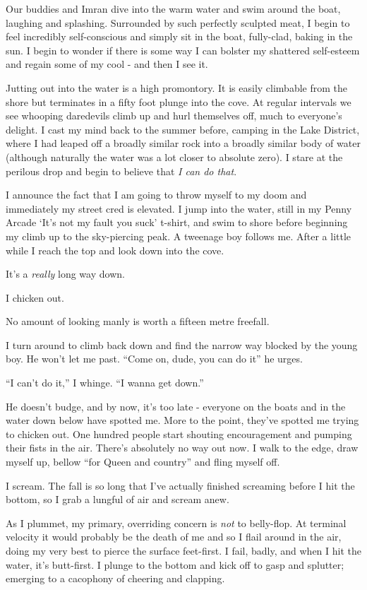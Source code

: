 \documentclass[a5paper,titlepage,11pt,draft]{book}
\begin{document}
Our buddies and Imran dive into the warm water and swim around the boat, laughing and splashing.  Surrounded by such perfectly sculpted meat, I begin to feel incredibly self-conscious and simply sit in the boat, fully-clad, baking in the sun.  I begin to wonder if there is some way I can bolster my shattered self-esteem and regain some of my cool - and then I see it.

Jutting out into the water is a high promontory.  It is easily climbable from the shore but terminates in a fifty foot plunge into the cove.  At regular intervals we see whooping daredevils climb up and hurl themselves off, much to everyone's delight.  I cast my mind back to the summer before, camping in the Lake District, where I had leaped off a broadly similar rock into a broadly similar body of water (although naturally the water was a lot closer to absolute zero).  I stare at the perilous drop and begin to believe that \emph{I can do that}.

I announce the fact that I am going to throw myself to my doom and immediately my street cred is elevated.  I jump into the water, still in my Penny Arcade `It's not my fault you suck' t-shirt, and swim to shore before beginning my climb up to the sky-piercing peak.  A tweenage boy follows me.  After a little while I reach the top and look down into the cove.

It's a \emph{really} long way down.

I chicken out.

No amount of looking manly is worth a fifteen metre freefall.

I turn around to climb back down and find the narrow way blocked by the young boy.  He won't let me past. ``Come on, dude, you can do it'' he urges.

``I can't do it,'' I whinge.  ``I wanna get down.''

He doesn't budge, and by now, it's too late - everyone on the boats and in the water down below have spotted me.  More to the point, they've spotted me trying to chicken out.  One hundred people start shouting encouragement and pumping their fists in the air.  There's absolutely no way out now.  I walk to the edge, draw myself up, bellow ``for Queen and country'' and fling myself off.

I scream.  The fall is so long that I've actually finished screaming before I hit the bottom, so I grab a lungful of air and scream anew.

As I plummet, my primary, overriding concern is \emph{not} to belly-flop.  At terminal velocity it would probably be the death of me and so I flail around in the air, doing my very best to pierce the surface feet-first.  I fail, badly, and when I hit the water, it's butt-first.  I  plunge to the bottom and kick off to gasp and splutter; emerging to a cacophony of cheering and clapping.
\end{document}
